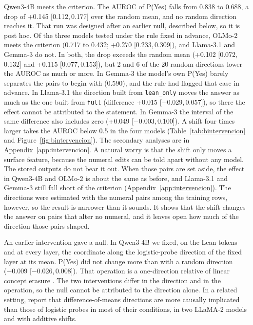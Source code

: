 \documentclass[10pt]{article}
\newcommand{\vr}[1]{\texttt{#1}}
\newcommand{\ic}[2]{[#1,\,#2]}
\begin{document}
Qwen3-4B meets the criterion. The AUROC of P(Yes) falls from 0.838 to 0.688, a drop of +0.145 \ic{0.112}{0.177} over the random
mean, and no random direction reaches it. That run was designed after an earlier null, described below, so it is post
hoc. Of the three models tested under the rule fixed in advance, OLMo-2 meets the criterion (0.717 to 0.432; +0.270
\ic{0.233}{0.309}), and Llama-3.1 and Gemma-3 do not. In both, the drop exceeds the random mean (+0.102
\ic{0.072}{0.132} and +0.115 \ic{0.077}{0.153}), but 2 and 6 of the 20 random directions lower the AUROC as much or
more. In Gemma-3 the model's own P(Yes) barely separates the pairs to begin with (0.590), and the rule had flagged
that case in advance. In Llama-3.1 the direction built from \vr{lean\_only} moves the answer as much as the one built
from \vr{full} (difference +0.015 \ic{−0.029}{0.057}), so there the effect cannot be attributed to the statement.
In Gemma-3 the interval of the same difference also includes zero (+0.049 \ic{−0.003}{0.100}).
A shift four times larger takes the AUROC below 0.5 in the four models (Table~\ref{tab:bintervencion} and
Figure~\ref{fig:bintervencion}). The secondary analyses
are in Appendix~\ref{app:intervencion}.
A natural worry is that the shift only moves a surface feature, because the numeral edits can be told apart without
any model. The stored outputs do not bear it out. When those pairs are set aside, the effect in Qwen3-4B and OLMo-2 is about the
same as before, and Llama-3.1 and Gemma-3 still fall short of the criterion (Appendix~\ref{app:intervencion}). The
directions were estimated with the numeral pairs among the training rows, however, so the result is narrower than it
sounds. It shows that the shift changes the answer on pairs that alter no numeral, and it leaves open how much of the
direction those pairs shaped.

An earlier intervention gave a null. In Qwen3-4B we fixed, on the Lean tokens and at every layer, the coordinate along
the logistic-probe direction of the fixed layer at its mean. P(Yes) did not change more than with a random direction
(−0.009 \ic{−0.026}{0.008}). That operation is a one-direction relative of linear concept erasure
\citep{ravfogel2020null,belrose2023leace}. The two interventions differ in the direction and in the operation, so the
null cannot be attributed to the direction alone. In a related setting, \citet{geometry} report that
difference-of-means directions are more causally implicated than those of logistic probes in most of their conditions,
in two LLaMA-2 models and with additive shifts.
\end{document}
